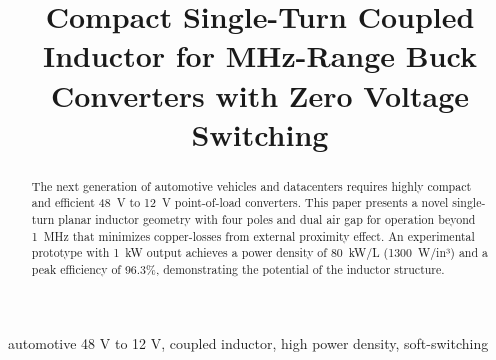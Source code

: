 \documentclass[a4paper]{IPEC2026}
\begin{document}
\title{Compact Single-Turn Coupled Inductor for MHz-Range Buck Converters with Zero Voltage Switching}

\maketitle

\begin{abstract}
The next generation of automotive vehicles and datacenters requires highly compact and efficient 48~V to 12~V point-of-load converters. This paper presents a novel single-turn planar inductor geometry with four poles and dual air gap for operation beyond 1~MHz that minimizes copper-losses from external proximity effect. An experimental prototype with 1~kW output achieves a power density of 80~kW/L (1300~W/in³) and a peak efficiency of 96.3\%, demonstrating the potential of the inductor structure.
\end{abstract}

\begin{IEEEkeywords}
automotive 48 V to 12 V, coupled inductor, high power density, soft-switching
\end{IEEEkeywords}
\end{document}

